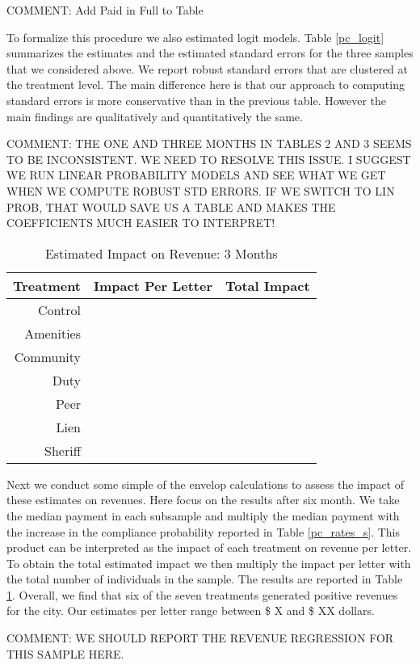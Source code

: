 \documentclass[12pt]{article}
\begin{document}
COMMENT: Add Paid in Full to Table


To formalize this procedure we also estimated logit models. Table 
\ref{pc_logit} summarizes the estimates and the estimated
standard errors for the three samples that we considered above. We
report robust standard errors that are clustered at the treatment level. The main difference
here is that our approach to computing standard errors  is more conservative than in the previous table.
However the main findings are qualitatively and quantitatively the same.

\noindent COMMENT: THE ONE AND THREE MONTHS IN TABLES 2 AND 3 SEEMS TO BE INCONSISTENT. WE NEED TO RESOLVE THIS ISSUE. I SUGGEST WE RUN LINEAR PROBABILITY MODELS AND SEE WHAT WE GET WHEN WE COMPUTE ROBUST STD ERRORS. IF WE SWITCH TO LIN PROB, THAT WOULD SAVE US A TABLE AND MAKES THE COEFFICIENTS MUCH EASIER TO INTERPRET!


\begin{table}[htbp]
\centering
\caption{Estimated Impact on Revenue: 3 Months} \label{pc_rev_s}
\begin{tabular}{rrr}
 \hline
Treatment & Impact Per Letter & Total Impact \\ 
\hline
Control & &  \\
Amenities &  &  \\
Community &  &  \\
Duty &  &  \\
Peer &  &  \\
Lien &  &  \\
Sheriff &  &  \\
\hline
\end{tabular}
\end{table}


Next we conduct some simple of the envelop calculations to assess the impact of these estimates on revenues. Here focus on the results after six month. We take the median payment in each subsample and multiply the median payment with the increase in the compliance probability reported in Table \ref{pc_rates_s}. This product can be interpreted as the impact of each treatment on revenue per letter. To obtain the total estimated impact we then multiply the impact per letter with the total number of individuals in the sample. The results are reported in Table \ref{pc_rev_s}.
Overall, we find that six of the seven treatments generated positive revenues for the city. Our estimates per letter range between \$ X and \$ XX dollars.

\noindent COMMENT: WE SHOULD REPORT THE REVENUE REGRESSION FOR THIS SAMPLE HERE. 
\end{document}
